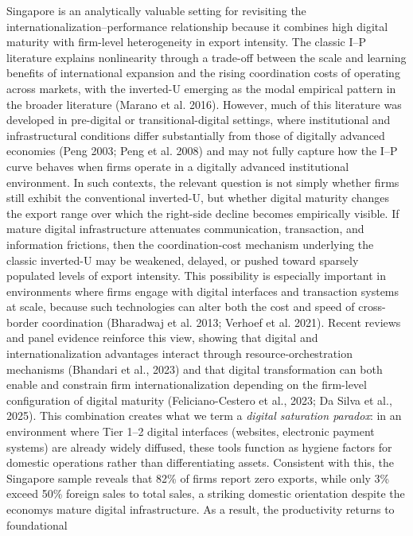 \documentclass[12pt,a4paper]{article}
\begin{document}
Singapore is an analytically valuable setting for revisiting the
internationalization--performance relationship because it combines high
digital maturity with firm-level heterogeneity in export intensity. The
classic I--P literature explains nonlinearity through a trade-off
between the scale and learning benefits of international expansion and
the rising coordination costs of operating across markets, with the
inverted-U emerging as the modal empirical pattern in the broader
literature (Marano et al. 2016). However, much of this literature was
developed in pre-digital or transitional-digital settings, where
institutional and infrastructural conditions differ substantially from
those of digitally advanced economies (Peng 2003; Peng et al. 2008) and
may not fully capture how the I--P curve behaves when firms operate in a
digitally advanced institutional environment. In such contexts, the
relevant question is not simply whether firms still exhibit the
conventional inverted-U, but whether digital maturity changes the export
range over which the right-side decline becomes empirically visible. If
mature digital infrastructure attenuates communication, transaction, and
information frictions, then the coordination-cost mechanism underlying
the classic inverted-U may be weakened, delayed, or pushed toward
sparsely populated levels of export intensity. This possibility is
especially important in environments where firms engage with digital
interfaces and transaction systems at scale, because such technologies
can alter both the cost and speed of cross-border coordination
(Bharadwaj et al. 2013; Verhoef et al. 2021). Recent reviews and panel
evidence reinforce this view, showing that digital and
internationalization advantages interact through resource-orchestration
mechanisms (Bhandari et al., 2023) and that digital transformation can
both enable and constrain firm internationalization depending on the
firm-level configuration of digital maturity (Feliciano-Cestero et al.,
2023; Da Silva et al., 2025). This combination creates what we term a
\emph{digital saturation paradox}: in an environment where Tier 1--2
digital interfaces (websites, electronic payment systems) are already
widely diffused, these tools function as hygiene factors for domestic
operations rather than differentiating assets. Consistent with this, the
Singapore sample reveals that 82\% of firms report zero exports, while
only 3\% exceed 50\% foreign sales to total sales, a striking domestic
orientation despite the economy\textquotesingle s mature digital
infrastructure. As a result, the productivity returns to foundational
\end{document}
